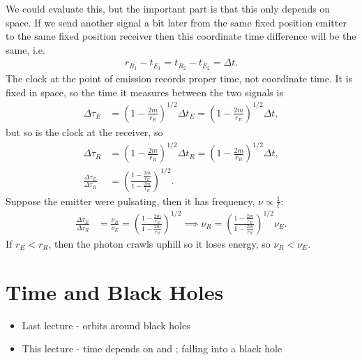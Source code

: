 \documentclass[a4paper, 11pt, normalem]{report}
\begin{document}
We could evaluate this, but the important part is that this only depends on space. 
If we send another signal a bit later from the same fixed position emitter to the same fixed position receiver then this coordinate time difference will be the same, i.e.
\begin{align}
    r_{R_1}-t_{E_1} = t_{R_2}-t_{E_2} = \Delta t.
\end{align}
The clock at the point of emission records proper time, not coordinate time. 
It is fixed in space, so the time it measures between the two signals is
\begin{align}
    \Delta\tau_E &= \left(1-\frac{2m}{r_E}\right)^{1/2}\Delta t_E = \left(1-\frac{2m}{r_E}\right)^{1/2}\Delta t,
\end{align}
but so is the clock at the receiver, so
\begin{align}
    \Delta\tau_R &= \left(1-\frac{2m}{r_R}\right)^{1/2}\Delta t_R = \left(1-\frac{2m}{r_R}\right)^{1/2}\Delta t, \\
    \frac{\Delta\tau_E}{\Delta\tau_R} &=\left(\frac{1-\frac{2m}{r_E}}{1-\frac{2m}{r_R}}\right)^{1/2}.
\end{align}
Suppose the emitter were pulsating, then it has frequency, $\nu\propto\frac{1}{t}$:
\begin{align}
    \frac{\Delta\tau_E}{\Delta\tau_R} &= \frac{\nu_R}{\nu_E} = \left(\frac{1-\frac{2m}{r_E}}{1-\frac{2m}{r_R}}\right)^{1/2} \implies \nu_R = \left(\frac{1-\frac{2m}{r_E}}{1-\frac{2m}{r_R}}\right)^{1/2}\nu_E.
\end{align}
If $r_E<r_R$, then the photon crawls uphill so it loses energy, so $\nu_R<\nu_E$.



\chapter{}

\chapter{}

\chapter{}

\chapter{Time and Black Holes}
\begin{itemize}
    \item Last lecture - orbits around black holes
    \item This lecture - time depends on  and ; falling into a black hole
\end{itemize}
\end{document}
